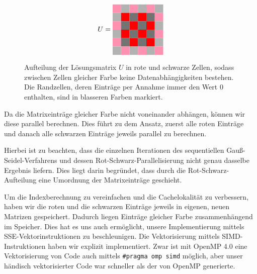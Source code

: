 \documentclass{article}
\begin{document}
\begin{figure}[h!]
\centering
$$U = 
\begin{tabular}{cccccc}
  \cellcolor{rose} & \cellcolor[gray]{0.7} & \cellcolor{rose} & \cellcolor[gray]{0.7} & \cellcolor{rose} & \cellcolor[gray]{0.7}\\
 \cellcolor[gray]{0.7} & \cellcolor{red} & \cellcolor[gray]{0.45} & \cellcolor{red} & \cellcolor[gray]{0.45} & \cellcolor{rose}\\
  \cellcolor{rose} & \cellcolor[gray]{0.45} & \cellcolor{red} & \cellcolor[gray]{0.45} & \cellcolor{red} & \cellcolor[gray]{0.7}\\
 \cellcolor[gray]{0.7} & \cellcolor{red} & \cellcolor[gray]{0.45} & \cellcolor{red} & \cellcolor[gray]{0.45} & \cellcolor{rose} \\
 \cellcolor{rose} & \cellcolor[gray]{0.45} & \cellcolor{red} & \cellcolor[gray]{0.45} & \cellcolor{red} & \cellcolor[gray]{0.7}\\
 \cellcolor[gray]{0.7} & \cellcolor{rose} & \cellcolor[gray]{0.7} & \cellcolor{rose} & \cellcolor[gray]{0.7} & \cellcolor{rose}\\
\end{tabular}
$$
\caption{Aufteilung der Lösungsmatrix $U$ in rote und schwarze Zellen, sodass zwischen Zellen gleicher Farbe keine Datenabhängigkeiten bestehen. Die Randzellen, deren Einträge per Annahme immer den Wert $0$ enthalten, sind in blasseren Farben markiert.}
\label{fig:matrix}
\end{figure}

Da die Matrixeinträge gleicher Farbe nicht voneinander abhängen, können wir diese parallel berechnen. Dies führt zu dem Ansatz, zuerst alle roten Einträge und danach alle schwarzen Einträge jeweils parallel zu berechnen.

Hierbei ist zu beachten, dass die einzelnen Iterationen des sequentiellen Gauß-Seidel-Verfahrens und dessen Rot-Schwarz-Parallelisierung nicht genau dasselbe Ergebnis liefern. Dies liegt darin begründet, dass durch die Rot-Schwarz-Aufteilung eine Umordnung der Matrixeinträge geschieht.

Um die Indexberechnung zu vereinfachen und die Cachelokalität zu verbessern, haben wir die roten und die schwarzen Einträge jeweils in eigenen, neuen Matrizen gespeichert. Dadurch liegen Einträge gleicher Farbe zusammenhängend im Speicher. Dies hat es uns auch ermöglicht, unsere Implementierung mittels SSE-Vektorinstruktionen zu beschleunigen. Die Vektorisierung mittels SIMD-Instruktionen haben wir explizit implementiert. Zwar ist mit OpenMP 4.0 eine Vektorisierung von Code auch mittels \texttt{\#pragma omp simd} möglich, aber unser händisch vektorisierter Code war schneller als der von OpenMP generierte.
\end{document}
